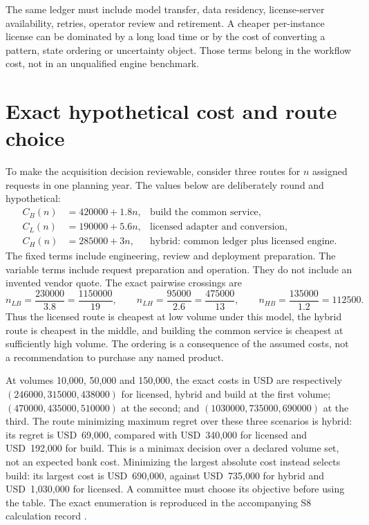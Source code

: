 The same ledger must include model transfer, data residency, license-server
availability, retries, operator review and retirement. A cheaper per-instance
license can be dominated by a long load time or by the cost of converting a
pattern, state ordering or uncertainty object. Those terms belong in the
workflow cost, not in an unqualified engine benchmark.




\section{Exact hypothetical cost and route choice}
\label{exec17:s8-cost}

To make the acquisition decision reviewable, consider three routes for $n$
assigned requests in one planning year. The values below are deliberately
round and hypothetical:
\begin{align}
 C_B(n)&=420000+1.8n, &\text{build the common service},\\
 C_L(n)&=190000+5.6n, &\text{licensed adapter and conversion},\\
 C_H(n)&=285000+3n, &\text{hybrid: common ledger plus licensed engine}.
 \label{exec17:s8-costs}
\end{align}
The fixed terms include engineering, review and deployment preparation. The
variable terms include request preparation and operation. They do not include
an invented vendor quote. The exact pairwise crossings are
\begin{equation}
 n_{LB}=\frac{230000}{3.8}=\frac{1150000}{19},\qquad
 n_{LH}=\frac{95000}{2.6}=\frac{475000}{13},\qquad
 n_{HB}=\frac{135000}{1.2}=112500.
 \label{exec17:s8-crossings}
\end{equation}
Thus the licensed route is cheapest at low volume under this model, the
hybrid route is cheapest in the middle, and building the common service is
cheapest at sufficiently high volume. The ordering is a consequence of the
assumed costs, not a recommendation to purchase any named product.

At volumes 10,000, 50,000 and 150,000, the exact costs in USD are respectively
$(246000,315000,438000)$ for licensed, hybrid and build at the first volume;
$(470000,435000,510000)$ at the second; and $(1030000,735000,690000)$ at the
third. The route minimizing maximum regret over these three scenarios is hybrid:
its regret is USD~69,000, compared with USD~340,000 for licensed and USD~192,000 for
build. This is a minimax decision over a declared volume set, not an expected
bank cost. Minimizing the largest absolute cost instead selects build: its
largest cost is USD~690,000, against USD~735,000 for hybrid and USD~1,030,000
for licensed. A committee must choose its objective before using the table.
The exact enumeration is reproduced in the accompanying S8 calculation record
\citep{exec17_s8_examples}.

